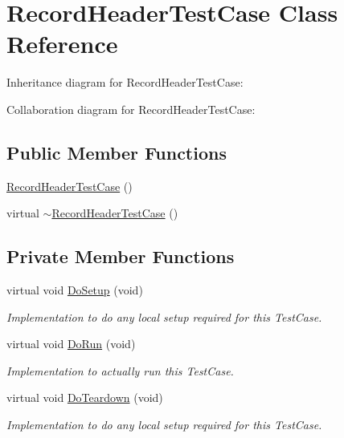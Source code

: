 \hypertarget{classRecordHeaderTestCase}{}\section{Record\+Header\+Test\+Case Class Reference}
\label{classRecordHeaderTestCase}


Inheritance diagram for Record\+Header\+Test\+Case\+:


Collaboration diagram for Record\+Header\+Test\+Case\+:
\subsection*{Public Member Functions}
\begin{DoxyCompactItemize}
\item 
\hyperlink{classRecordHeaderTestCase_aa0fb3827579ea3b8023609bbf1045ffb}{Record\+Header\+Test\+Case} ()
\item 
virtual \hyperlink{classRecordHeaderTestCase_a0ad70013e458684964a07770366ad4e9}{$\sim$\+Record\+Header\+Test\+Case} ()
\end{DoxyCompactItemize}
\subsection*{Private Member Functions}
\begin{DoxyCompactItemize}
\item 
virtual void \hyperlink{classRecordHeaderTestCase_aad4a302ea73173b4c70902a897933b04}{Do\+Setup} (void)
\begin{DoxyCompactList}\small\item\em Implementation to do any local setup required for this Test\+Case. \end{DoxyCompactList}\item 
virtual void \hyperlink{classRecordHeaderTestCase_aaf35f7eec6dee5bbf435fe7807287491}{Do\+Run} (void)
\begin{DoxyCompactList}\small\item\em Implementation to actually run this Test\+Case. \end{DoxyCompactList}\item 
virtual void \hyperlink{classRecordHeaderTestCase_aa51bec063ad3fac6ccf2b6d3e7d51bed}{Do\+Teardown} (void)
\begin{DoxyCompactList}\small\item\em Implementation to do any local setup required for this Test\+Case. \end{DoxyCompactList}\end{DoxyCompactItemize}
